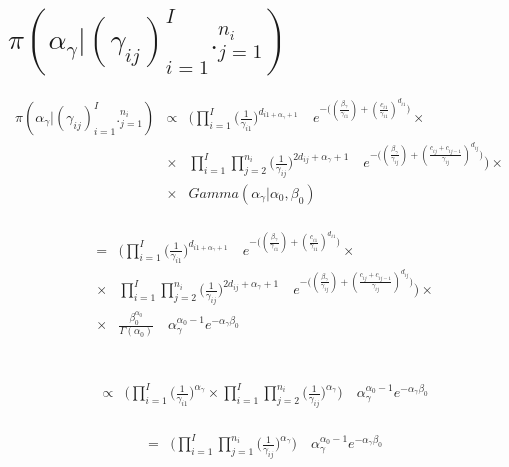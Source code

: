 \documentclass[10pt]{report}
\theoremstyle{plain}
\begin{document}
\section{$\pi(\alpha_\gamma|(\gamma_{ij})_{i=1}^I._{j=1}^{n_i})$}
\begin{eqnarray*}
\pi(\alpha_\gamma|(\gamma_{ij})_{i=1}^I._{j=1}^{n_i}) &\propto& \Bigg(\prod_{i=1}^I \bigg(\frac{1}{\gamma_{i1}}\bigg)^{d_{i1+\alpha_\gamma+1}}\quad e^{-\big((\frac{\beta_\gamma}{\gamma_{i1}})+(\frac{c_{i1}}{\gamma_{i1}})^{d_{i1}}\big)}\times\\
&\times& \prod_{i=1}^I \prod_{j=2}^{n_i} \bigg(\frac{1}{\gamma_{ij}}\bigg)^{2d_{ij}+\alpha_\gamma+1}\quad e^{-\big((\frac{\beta_\gamma}{\gamma_{ij}})+(\frac{c_{ij}+c_{ij-1}}{\gamma_{ij}})^{d_{ij}}\big)}\Bigg)\times \\
&\times& Gamma(\alpha_\gamma|\alpha_0,\beta_0)
\end{eqnarray*}
\\
\begin{eqnarray*}
&=&\Bigg(\prod_{i=1}^I \bigg(\frac{1}{\gamma_{i1}}\bigg)^{d_{i1+\alpha_\gamma+1}}\quad e^{-\big((\frac{\beta_\gamma}{\gamma_{i1}})+(\frac{c_{i1}}{\gamma_{i1}})^{d_{i1}}\big)}\times\\
&\times& \prod_{i=1}^I \prod_{j=2}^{n_i} \bigg(\frac{1}{\gamma_{ij}}\bigg)^{2d_{ij}+\alpha_\gamma+1}\quad e^{-\big((\frac{\beta_\gamma}{\gamma_{ij}})+(\frac{c_{ij}+c_{ij-1}}{\gamma_{ij}})^{d_{ij}}\big)}\Bigg)\times \\
&\times& \frac{\beta_0^{\alpha_0}}{\Gamma(\alpha_0)} \quad \alpha_\gamma^{\alpha_0-1} e^{-\alpha_\gamma\beta_0}
\end{eqnarray*}
\\
\\
\begin{eqnarray*}
&\propto& \Bigg(\prod_{i=1}^I \Big(\frac{1}{\gamma_{i1}}\Big)^{\alpha_\gamma} \times \prod_{i=1}^I \prod_{j=2}^{n_i}\Big(\frac{1}{\gamma_{ij}}\Big)^{\alpha_\gamma}\Bigg)\quad \alpha_\gamma^{\alpha_0-1}e^{-\alpha_\gamma\beta_0}
\end{eqnarray*}
\\
\begin{eqnarray*}
&=&\Bigg(\prod_{i=1}^I \prod_{j=1}^{n_i} \Big(\frac{1}{\gamma_{ij}}\Big)^{\alpha_\gamma}\Bigg) \quad \alpha_\gamma^{\alpha_0-1}e^{-\alpha_\gamma\beta_0}
\end{eqnarray*}
\\
\\
\\
\end{document}
